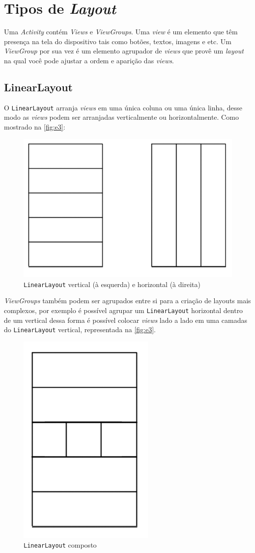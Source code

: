 \documentclass[a4paper,12pt,brazil,oneside]{book}
\begin{document}
\section{Tipos de \emph{Layout}}
Uma \emph{Activity} contém \emph{Views} e \emph{ViewGroups}. Uma \emph{view} é um elemento que têm presença na tela do dispositivo tais como botões, textos, imagens e etc. Um \emph{ViewGroup} por sua vez é um elemento agrupador de \emph{views} que provê um \emph{layout} na qual você pode ajustar a ordem e aparição das \emph{views}. 

\subsection{LinearLayout}

O \texttt{LinearLayout} arranja \emph{views} em uma única coluna ou uma única linha, desse modo as \emph{views} podem ser arranjadas verticalmente ou horizontalmente. Como mostrado na \autoref{fig:e3}:

\begin{figure}[H]
  \centering
  \includegraphics[width=.45\textwidth]{figuras/design/linearlayout.jpg}
  \caption{\texttt{LinearLayout} vertical (à esquerda) e horizontal (à direita)}
  \label{fig:e3}
\end{figure}

\emph{ViewGroups} também podem ser agrupados entre si para a criação de layouts mais complexos, por exemplo é possível agrupar um \texttt{LinearLayout} horizontal dentro de um vertical dessa forma é possível colocar \emph{views} lado a lado em uma camadas do \texttt{LinearLayout} vertical, representada na \autoref{fig:e3}.

\begin{figure}[H]
  \centering
  \includegraphics[width=.25\textwidth]{figuras/design/linearlayout-composto.jpg}
  \caption{\texttt{LinearLayout} composto}
  \label{fig:e4}
\end{figure}
\end{document}
